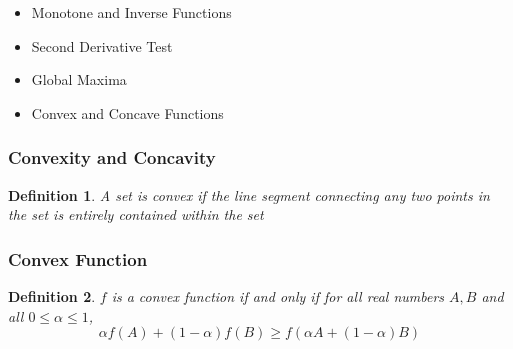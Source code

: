 \documentclass[aspectratio=169]{beamer}
\newtheorem{defn}{Definition}
\numberwithin{equation}{section}
\begin{document}
\begin{frame}

\begin{itemize}
\item \textcolor{mygray}{Monotone and Inverse Functions}

\item \textcolor{mygray}{Second Derivative Test}
\item \textcolor{mygray}{Global Maxima}
\item \textcolor{myblack}{Convex and Concave Functions}
\end{itemize}

\end{frame}



\begin{frame}
\frametitle{Convexity and Concavity}
 
\begin{defn}
A set is \textit{convex} if the line segment connecting any two points in the set is entirely contained within the set
\end{defn}

\begin{center}
\end{center}

\end{frame}



\begin{frame}
\frametitle{Convex Function}

\begin{defn}
$f$ is a convex function if and only if for all real numbers $A, B$ and all $0\leq \alpha \leq 1$, 
$$\alpha f(A)+(1-\alpha)f(B)\geq f(\alpha A+(1-\alpha)B)$$
\end{defn}

\begin{center}
\end{center}

\end{frame}
\end{document}
